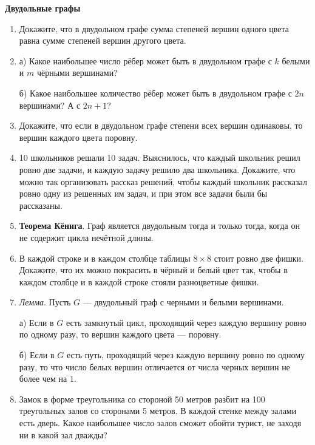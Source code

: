 \documentclass{article}
\begin{document}
\large
	
\begin{center}
	\textbf{Двудольные графы}
\end{center}


\begin{enumerate}[label*=\protect\fbox{\arabic{enumi}}]
	
\item Докажите, что в двудольном графе сумма степеней вершин одного цвета равна сумме степеней вершин другого цвета.

\item а) Какое наибольшее число рёбер может быть в двудольном графе с $k$ белыми и $m$ чёрными вершинами?

б) Какое наибольшее количество рёбер может быть в двудольном графе с $2n$ вершинами? А с $2n + 1$?

\item Докажите, что если в двудольном графе степени всех вершин одинаковы, то вершин каждого цвета поровну.

\item 10 школьников решали 10 задач. Выяснилось, что каждый школьник решил ровно две задачи, и каждую задачу решило два школьника. Докажите, что можно так организовать рассказ решений, чтобы каждый школьник рассказал ровно одну из решенных им задач, и при этом все задачи были бы рассказаны.

\item \textbf{Теорема Кёнига}. Граф является двудольным тогда и только тогда, когда он не содержит цикла нечётной длины.

\item В каждой строке и в каждом столбце таблицы $8 \times 8$ стоит ровно две фишки. Докажите, что их можно покрасить в чёрный и белый цвет так, чтобы в каждом столбце и в каждой строке стояли разноцветные фишки.

\item \textit{Лемма}. Пусть $G$ — двудольный граф с черными и белыми вершинами.

а) Если в $G$ есть замкнутый цикл, проходящий через каждую вершину ровно по одному разу, то вершин каждого цвета — поровну.

б) Если в $G$ есть путь, проходящий через каждую вершину ровно по одному разу, то что число белых вершин отличается от числа черных вершин не более чем на $1$.

\item Замок в форме треугольника со стороной 50 метров разбит на 100 треугольных залов со сторонами 5 метров. В каждой стенке между залами есть дверь. Какое наибольшее число залов сможет обойти турист, не заходя ни в какой зал дважды?


\end{enumerate}
\end{document}
